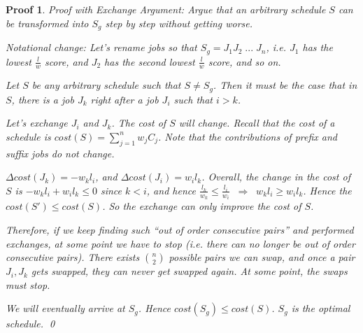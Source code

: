 \documentclass[twoside]{article}
\newtheorem{protoproof}[prototheorem]{Proof}
\renewenvironment{proof}
{\colorlet{shadecolor}{blue!15}\begin{shaded}\begin{protoproof}
		\normalfont}
		{\qed\end{protoproof}\end{shaded}}
\begin{document}
\begin{proof}
	Proof with Exchange Argument: Argue that an arbitrary schedule $S$ can be transformed into $S_g$ step by step without getting worse. 
		
	Notational change: Let's rename jobs so that $S_g = J_1J_2\;...\;J_n$, i.e. $J_1$ has the lowest $\frac{l}{w}$ score, and $J_2$ has the second lowest $\frac{l}{w}$ score, and so on. 
		
	Let $S$ be any arbitrary schedule such that $S \neq S_g$. Then it must be the case that in $S$, there is a job $J_k$ right after a job $J_i$ such that $i > k$. 
		
	Let's exchange $J_i$ and $J_k$. The cost of $S$ will change. Recall that the cost of a schedule is $cost(S) = \sum_{j=1}^{n}w_jC_j$. Note that the contributions of prefix and suffix jobs do not change. 
		
	$\Delta cost(J_k) = -w_kl_i$, and $\Delta cost(J_i) = w_il_k$. Overall, the change in the cost of $S$ is $-w_kl_i + w_il_k \leq 0$ since $k < i$, and hence $\frac{l_k}{w_k} \leq \frac{l_i}{w_i} \;\; \Rightarrow \;\; w_kl_i \geq w_il_k$. Hence the $cost(S') \leq cost(S)$. So the exchange can only improve the cost of $S$. 
		
	Therefore, if we keep finding such ``out of order consecutive pairs'' and performed exchanges, at some point we have to stop (i.e. there can no longer be out of order consecutive pairs). There exists $n \choose 2$ possible pairs we can swap, and once a pair $J_i, J_k$ gets swapped, they can never get swapped again. At some point, the swaps must stop. 
		
	We will eventually arrive at $S_g$. Hence $cost(S_g) \leq cost(S)$. $S_g$ is the optimal schedule. 
\end{proof}
\end{document}
